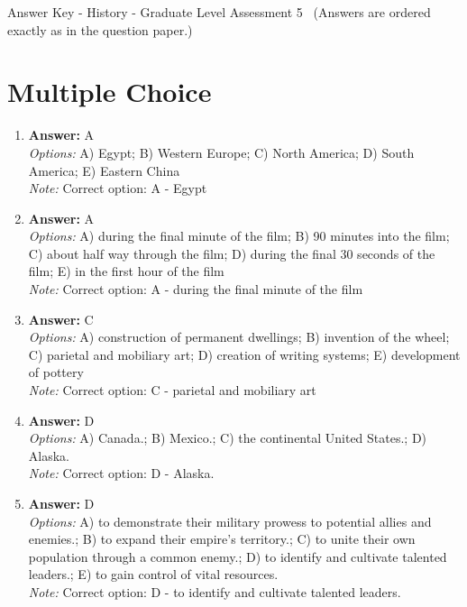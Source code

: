 \documentclass[12pt]{article}
\begin{document}
\begin{center}
Answer Key - History - Graduate Level Assessment 5 \
\small (Answers are ordered exactly as in the question paper.)
\end{center}

\section*{Multiple Choice}
\begin{enumerate}[label=\arabic*.]
\item \textbf{Answer:} A
\\ \textit{Options:} A) Egypt; B) Western Europe; C) North America; D) South America; E) Eastern China
\\ \textit{Note:} Correct option: A - Egypt
\item \textbf{Answer:} A
\\ \textit{Options:} A) during the final minute of the film; B) 90 minutes into the film; C) about half way through the film; D) during the final 30 seconds of the film; E) in the first hour of the film
\\ \textit{Note:} Correct option: A - during the final minute of the film
\item \textbf{Answer:} C
\\ \textit{Options:} A) construction of permanent dwellings; B) invention of the wheel; C) parietal and mobiliary art; D) creation of writing systems; E) development of pottery
\\ \textit{Note:} Correct option: C - parietal and mobiliary art
\item \textbf{Answer:} D
\\ \textit{Options:} A) Canada.; B) Mexico.; C) the continental United States.; D) Alaska.
\\ \textit{Note:} Correct option: D - Alaska.
\item \textbf{Answer:} D
\\ \textit{Options:} A) to demonstrate their military prowess to potential allies and enemies.; B) to expand their empire's territory.; C) to unite their own population through a common enemy.; D) to identify and cultivate talented leaders.; E) to gain control of vital resources.
\\ \textit{Note:} Correct option: D - to identify and cultivate talented leaders.
\end{enumerate}
\end{document}
